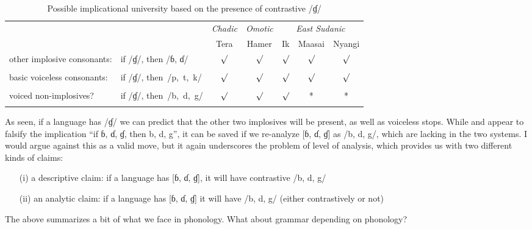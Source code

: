 \documentclass[output=paper]{langsci/langscibook}
\begin{document}
\begin{table}
\begin{tabularx}{\textwidth}{p{2.6cm}Xccccc}
\lsptoprule
&  & { \textit{Chadic}} & { \textit{Omotic}} & \multicolumn{3}{c}{ \textit{East Sudanic}}\\
&  & { Tera} & { Hamer} & { Ik} & { Maasai} & {Nyangi}\\
\midrule
\raggedright
other implosive consonants: & if /ɠ/, \newline then /ɓ, ɗ/ & ${\surd}$ & ${\surd}$ & ${\surd}$ & ${\surd}$ & ${\surd}$\\
\\	
\raggedright
basic voiceless consonants: & if /ɠ/, \newline \mbox{then /p, t, k/} & ${\surd}$ & ${\surd}$ & ${\surd}$ & ${\surd}$ & ${\surd}$\\
\\
\raggedright
voiced non-implosives? & if /ɠ/, \newline \mbox{then /b, d, g/} & ${\surd}$ & ${\surd}$ & ${\surd}$ & * & *\\
\lspbottomrule
\end{tabularx}
\caption{Possible implicational university based on the presence of contrastive /ɠ/}
\label{tab:hyman:implosives}
\end{table}

As seen, if a language has /ɠ/ we can predict that the other two implosives will be present, as well as voiceless stops. While  and  appear to falsify the implication “if ɓ, ɗ, ɠ, then b, d, g”, it can be saved if we re-analyze [ɓ, ɗ, ɠ]  as /b, d, g/, which are lacking in the two systems. I would argue against this as a valid move, but it again underscores the problem of level of analysis, which provides us with two different kinds of claims:

\begin{itemize}
 \item[(i)]  a descriptive claim:  if a language has [ɓ, ɗ, ɠ], it will have contrastive /b, d, g/
 \item[(ii)]  an analytic claim: if a language has [ɓ, ɗ, ɠ] it will have /b, d, g/ (either contrastively or not)
\end{itemize}

  

  

The above summarizes a bit of what we face in phonology. What about grammar depending on phonology?
\end{document}
